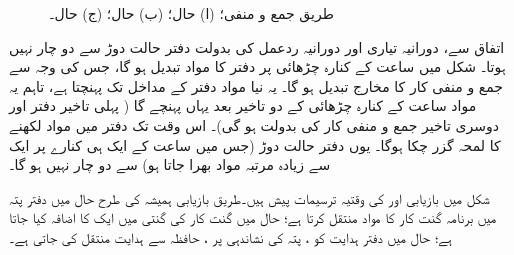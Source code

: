 \begin{figure}
\begin{subfigure}{0.30\textwidth}
\caption{}
\end{subfigure}
\caption{
طریق جمع و منفی؛ (ا)  حال؛ (ب)  حال؛ (ج)  حال۔
}
\label{شکل_کمپیوٹر_جمع_اور_منفی}
\end{figure}

اتفاق سے،   دورانیہ تیاری اور  دورانیہ ردعمل  کی بدولت دفتر  حالت دوڑ سے دو چار نہیں ہوتا۔ شکل  میں  ساعت کے  کنارہ چڑھائی  پر دفتر  کا  مواد تبدیل ہو گا، جس کی وجہ سے جمع و منفی کار کا مخارج تبدیل ہو گا۔ یہ نیا مواد دفتر   کے مداخل تک پہنچتا ہے، تاہم یہ مواد  ساعت کے کنارہ چڑھائی کے دو  تاخیر  بعد  یہاں پہنچے گا ( پہلی تاخیر   دفتر  اور دوسری  تاخیر جمع و منفی کار کی بدولت ہو گی)۔ اس وقت تک دفتر   میں مواد لکھنے کا لمحہ گزر چکا ہوگا۔ یوں دفتر  حالت دوڑ (جس میں ساعت کے  ایک  ہی کنارے پر  ایک سے زیادہ مرتبہ مواد بھرا جاتا ہو)  سے دو چار نہیں ہو گا۔

شکل    میں بازیابی اور   کی وقتیہ ترسیمات  پیش ہیں۔طریق  بازیابی  ہمیشہ کی طرح  حال میں  دفتر پتہ میں برنامہ گنت کار کا مواد منتقل کرتا ہے؛  حال میں  گنت کار کی گنتی میں ایک کا اضافہ کیا جاتا ہے؛  حال میں دفتر ہدایت  کو ،  پتہ کی نشاندہی پر ، حافظہ سے ہدایت منتقل کی جاتی ہے۔

